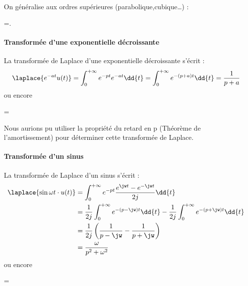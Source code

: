 On généralise aux ordres supérieures (parabolique,cubique\ldots) :
\begin{bequation}
    =.
\end{bequation}


\paragraph{Transformée d'une exponentielle décroissante}
La transformée de Laplace d'une exponentielle décroissante s'écrit :
$$
\laplace{e^{-at}u(t)}=\int_{0}^{+\infty} e^{-pt}e^{-at}\dd{t}=\int_{0}^{+\infty} e^{-(p+a)t}\dd{t} = \dfrac{1}{p+a}
$$
ou encore
\begin{bequation}
    =
\end{bequation}
Nous aurions pu utiliser la propriété du retard en p (Théorème de 
l'amortissement) pour déterminer cette transformée de Laplace.


\paragraph{Transformée d'un sinus}
La transformée de Laplace d'un sinus s'écrit :
\begin{align*}
\laplace{\sin{\omega t}\cdot u(t)}&=\int_{0}^{+\infty}e^{-pt}\dfrac{e^{\jw t}-e^{-\jw t}}{2j}\dd{t}\\
&=\dfrac{1}{2j}\int_{0}^{+\infty}e^{-(p-\jw)t}\dd{t} - \dfrac{1}{2j}\int_{0}^{+\infty}e^{-(p+\jw)t}\dd{t} \\
&=\dfrac{1}{2j}\left( \dfrac{1}{p-\jw}-\dfrac{1}{p+\jw}\right)\\
&=\dfrac{\omega}{p^2+\omega^2}
\end{align*}
ou encore
\begin{bequation}
    =
\end{bequation}

